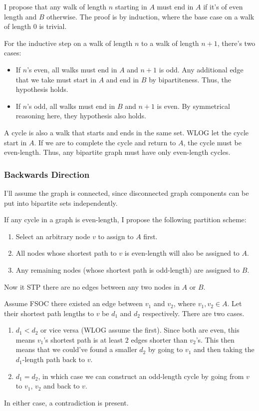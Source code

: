 \documentclass[12pt]{article}
\begin{document}
I propose that any walk of length $n$ starting in $A$
must end in $A$ if it's of even length and $B$ otherwise.
The proof is by induction, where the base case on a walk of length $0$ is trivial.

For the inductive step on a walk of length $n$ to a walk of length $n+1$, there's two cases:
\begin{itemize}[nolistsep]
      \item If $n$'s even, all walks must end in $A$ and $n+1$ is odd.
            Any additional edge that we take must start in $A$ and end in $B$ by bipartiteness.
            Thus, the hypothesis holds.
      \item If $n$'s odd, all walks must end in $B$ and $n+1$ is even.
            By symmetrical reasoning here, they hypothesis also holds.
\end{itemize}

A cycle is also a walk that starts and ends in the same set.
WLOG let the cycle start in $A$.
If we are to complete the cycle and return to $A$, the cycle must be even-length.
Thus, any bipartite graph must have only even-length cycles.

\subsubsection{Backwards Direction}

I'll assume the graph is connected, since disconnected graph components
can be put into bipartite sets independently.

If any cycle in a graph is even-length, I propose the following partition scheme:
\begin{enumerate}[nolistsep,label=\arabic*.]
      \item Select an arbitrary node $v$ to assign to $A$ first.
      \item All nodes whose shortest path to $v$ is even-length will also be assigned to $A$.
      \item Any remaining nodes (whose shortest path is odd-length) are assigned to $B$.
\end{enumerate}

Now it STP there are no edges between any two nodes in $A$ or $B$.

Assume FSOC there existed an edge between $v_1$ and $v_2$, where $v_1, v_2 \in A$.
Let their shortest path lengths to $v$ be $d_1$ and $d_2$ respectively.
There are two cases.
\begin{enumerate}[nolistsep,label=\arabic*.]
      \item $d_1 < d_2$ or vice versa (WLOG assume the first).
            Since both are even, this means $v_1$'s shortest path is at least $2$
            edges shorter than $v_2$'s.
            This then means that we could've found a smaller $d_2$
            by going to $v_1$ and then taking the $d_1$-length path back to $v$.
      \item $d_1=d_2$, in which case we can construct an odd-length cycle
            by going from $v$ to $v_1$, $v_2$ and back to $v$.
\end{enumerate}
In either case, a contradiction is present.
\end{document}
